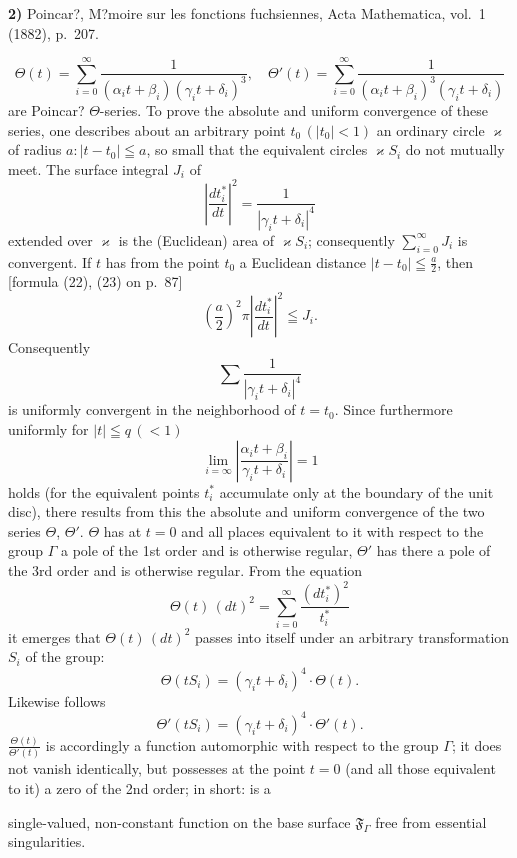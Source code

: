 \documentclass{article}
\begin{document}
\textbf{2)} Poincar?, M?moire sur les fonctions fuchsiennes, Acta Mathematica, vol.~1 (1882), p.~207.

\[ \Theta(t) = \sum_{i=0}^\infty \frac{1}{(\alpha_i t + \beta_i)(\gamma_i t + \delta_i)^3}, \quad \Theta'(t) = \sum_{i=0}^\infty \frac{1}{(\alpha_i t + \beta_i)^3(\gamma_i t + \delta_i)} \]
are Poincar? $\Theta$-series. To prove the absolute and uniform convergence of these series, one describes about an arbitrary point $t_0\,(|t_0| < 1)$ an ordinary circle $\varkappa$ of radius $a\colon |t - t_0| \leqq a$, so small that the equivalent circles $\varkappa S_i$ do not mutually meet. The surface integral $J_i$ of
\[ \left| \frac{dt_i^*}{dt} \right|^2 = \frac{1}{|\gamma_i t + \delta_i|^4} \]
extended over $\varkappa$ is the (Euclidean) area of $\varkappa S_i$; consequently $\displaystyle\sum_{i=0}^\infty J_i$ is convergent. If $t$ has from the point $t_0$ a Euclidean distance $|t - t_0| \leqq \frac{a}{2}$, then [formula (22), (23) on p.~87]
\[ \left( \frac{a}{2} \right)^2 \pi \left| \frac{dt_i^*}{dt} \right|^2 \leqq J_i. \]
Consequently
\[ \sum \frac{1}{|\gamma_i t + \delta_i|^4} \]
is uniformly convergent in the neighborhood of $t = t_0$. Since furthermore uniformly for $|t| \leqq q\,(< 1)$
\[ \lim_{i = \infty} \left| \frac{\alpha_i t + \beta_i}{\gamma_i t + \delta_i} \right| = 1 \]
holds (for the equivalent points $t_i^*$ accumulate only at the boundary of the unit disc), there results from this the absolute and uniform convergence of the two series $\Theta$, $\Theta'$. $\Theta$ has at $t = 0$ and all places equivalent to it with respect to the group $\varGamma$ a pole of the 1st order and is otherwise regular, $\Theta'$ has there a pole of the 3rd order and is otherwise regular. From the equation
\[ \Theta(t)\,(dt)^2 = \sum_{i=0}^\infty \frac{(dt_i^*)^2}{t_i^*} \]
it emerges that $\Theta(t)\,(dt)^2$ passes into itself under an arbitrary transformation $S_i$ of the group:
\[ \Theta(tS_i) = (\gamma_i t + \delta_i)^4 \cdot \Theta(t). \]
Likewise follows
\[ \Theta'(tS_i) = (\gamma_i t + \delta_i)^4 \cdot \Theta'(t). \]
$\frac{\Theta(t)}{\Theta'(t)}$ is accordingly a function automorphic with respect to the group $\varGamma$; it does not vanish identically, but possesses at the point $t = 0$ (and all those equivalent to it) a zero of the 2nd order; in short: is a

single-valued, non-constant function on the base surface $\mathfrak{F}_\varGamma$ free from essential singularities.
\end{document}
